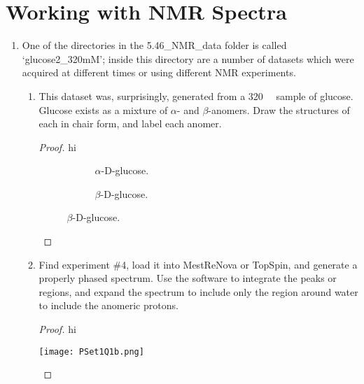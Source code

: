 \documentclass[../psets.tex]{subfiles}
\begin{document}
\section{Working with NMR Spectra}
\begin{enumerate}
    \item {}One of the directories in the 5.46\_NMR\_data folder is called `glucose2\_320mM'; inside this directory are a number of datasets which were acquired at different times or using different NMR experiments.
    \begin{enumerate}
        \item This dataset was, surprisingly, generated from a \SI{320}{\milli\molar} sample of glucose. Glucose exists as a mixture of $\alpha$- and $\beta$-anomers. Draw the structures of each in chair form, and label each anomer.
        \begin{proof}
            {\color{white}hi}
            \begin{figure}[H]
                \centering
                \footnotesize
                \begin{subfigure}[b]{0.25\linewidth}
                    \centering
                    \caption{$\alpha$-D-glucose.}
                \end{subfigure}
                \begin{subfigure}[b]{0.25\linewidth}
                    \centering
                    \caption{$\beta$-D-glucose.}
                \end{subfigure}
            \end{figure}
        \end{proof}
        \item Find experiment \#4, load it into MestReNova or TopSpin, and generate a properly phased spectrum. Use the software to integrate the peaks or regions, and expand the spectrum to include only the region around water to include the anomeric protons.
        \begin{proof}
            {\color{white}hi}
            \begin{center}
                \texttt{[image: PSet1Q1b.png]}
            \end{center}

\end{proof}
\end{enumerate}
\end{enumerate}
\end{document}
